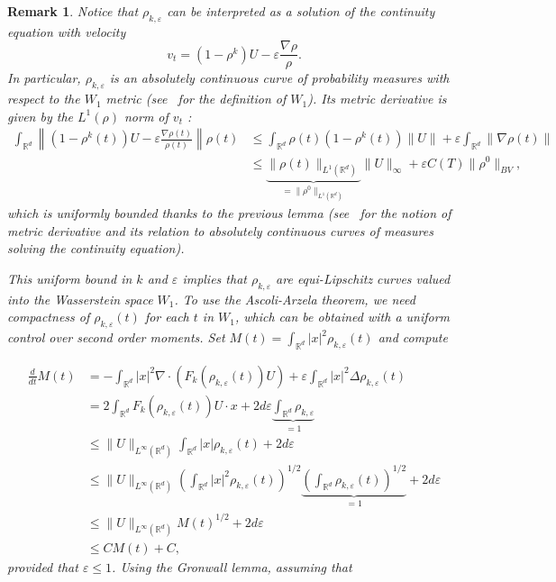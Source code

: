 \documentclass[11pt,twoside]{article}
\numberwithin{equation}{section}
\newcommand{\R}{\mathbb{R}}
\newcommand {\eps}  {\varepsilon}
\newcommand {\f}   {\frac}
\newcommand {\p}   {\partial}
\newtheorem{remark}[theorem]{Remark}
\begin{document}
\begin{remark}
Notice that $\rho_{k,\eps}$ can be interpreted as a solution of the continuity equation with velocity
\[
v_t = (1-\rho^k)U - \eps\frac{\nabla \rho}{\rho}.
\]
In particular, $\rho_{k,\eps}$ is an absolutely continuous curve of probability measures with respect to the $W_1$ metric (see~\cite{santambrogio_optimal_2015} for the definition of $W_1$). Its metric derivative is given by the $L^1(\rho)$ norm of $v_t$ :
\[
\begin{aligned}
\int_{\R^d} \left\|(1-\rho^k(t))U-\eps\f{\nabla \rho(t)}{\rho(t)} \right\| \rho(t) &\le \int_{\R^d} \rho(t)(1-\rho^k(t))\|U\| + \eps \int_{\R^d}\|\nabla \rho(t)\| \\
&\le \underbrace{\|\rho(t)\|_{L^1(\R^d)}}_{=\|\rho^0\|_{L^1(\R^d)}}\|U\|_{\infty} + \eps C(T)\|\rho^0\|_{BV},
\end{aligned}
\]
 which is uniformly bounded thanks to the previous lemma (see~\cite{ambrosio_gradient_2005} for the notion of metric derivative and its relation to absolutely continuous curves of measures solving the continuity equation). 

This uniform bound in $k$ and $\eps$ implies that $\rho_{k,\eps}$ are equi-Lipschitz curves valued into the Wasserstein space $W_1$. To use the Ascoli-Arzela theorem, we need compactness of $\rho_{k,\eps}(t)$ for each $t$ in $W_1$, which can be obtained with a uniform control over second order moments. Set $M(t) = \int_{\R^d}|x|^2\rho_{k,\eps}(t)$ and compute 

\[
\begin{aligned}
\f{d}{dt} M(t) 
&=  - \int_{\R^d} |x|^2\nabla \cdot(F_k(\rho_{k,\eps}(t))U)+ \eps \int_{\R^d} |x|^2\Delta \rho_{k,\eps}(t)\\
&= 2 \int_{\R^d} F_k(\rho_{k,\eps}(t))U\cdot x + 2d\eps\underbrace{\int_{\R^d}\rho_{k,\eps}}_{=1}\\
&\le \|U\|_{L^\infty(\R^d)}\int_{\R^d}|x|\rho_{k,\eps}(t) +2d\eps \\
&\le  \|U\|_{L^\infty(\R^d)} \left(\int_{\R^d}|x|^2 \rho_{k,\eps}(t)\right)^{1/2} \underbrace{\left(\int_{\R^d}\rho_{k,\eps}(t)\right)^{1/2}}_{=1} + 2d\eps\\
&\le  \|U\|_{L^\infty(\R^d)} M(t)^{1/2} + 2d\eps \\
&\le CM(t) + C,
\end{aligned}
\]
provided that $\eps \le 1$. Using the Gronwall lemma, assuming that 


\end{remark}
\end{document}
